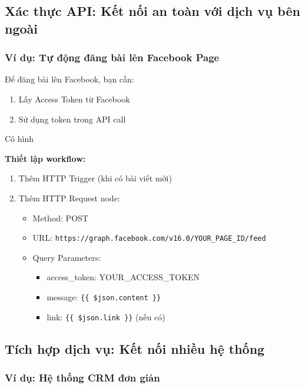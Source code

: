 \subsection{Xác thực API: Kết nối an toàn với dịch vụ bên ngoài}

\subsubsection{Ví dụ: Tự động đăng bài lên Facebook Page}

Để đăng bài lên Facebook, bạn cần:
\begin{enumerate}
    \item Lấy Access Token từ Facebook
    \item Sử dụng token trong API call
\end{enumerate}

Có hình

\textbf{Thiết lập workflow:}
\begin{enumerate}
    \item Thêm HTTP Trigger (khi có bài viết mới)
    \item Thêm HTTP Request node:
    \begin{itemize}
        \item Method: POST
        \item URL: \verb|https://graph.facebook.com/v16.0/YOUR_PAGE_ID/feed|
        \item Query Parameters:
        \begin{itemize}
            \item access\_token: YOUR\_ACCESS\_TOKEN
            \item message: \verb|{{ $json.content }}|
            \item link: \verb|{{ $json.link }}| (nếu có)
        \end{itemize}
    \end{itemize}
\end{enumerate}

\subsection{Tích hợp dịch vụ: Kết nối nhiều hệ thống}

\subsubsection{Ví dụ: Hệ thống CRM đơn giản}

